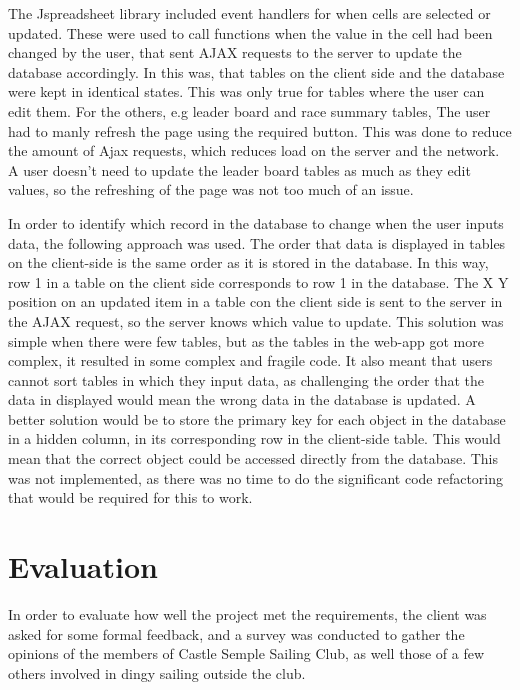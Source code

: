 \documentclass{l4proj}
\begin{document}
The Jspreadsheet library included event handlers for when cells are selected or updated. These were used to call functions when the value in the cell had been changed by the user, that sent AJAX requests to the server to update the database accordingly. In this was, that tables on the client side and the database were kept in identical states. This was only true for tables where the user can edit them. For the others, e.g leader board and race summary tables, The user had to manly refresh the page using the required button. This was done to reduce the amount of Ajax requests, which reduces load on the server and the network. A user doesn't need to update the leader board tables as much as they edit values, so the refreshing of the page was not too much of an issue.

In order to identify which record in the database to change when the user inputs data, the following approach was used. The order that data is displayed in tables on the client-side is the same order as it is stored in the database. In this way, row 1 in a table on the client side corresponds to row 1 in the database. The X Y position on an updated item in a table con the client side is sent to the server in the AJAX request, so the server knows which value to update. This solution was simple when there were few tables, but as the tables in the web-app got more complex, it resulted in some complex and fragile code. It also meant that users cannot sort tables in which they input data, as challenging the order that the data in displayed would mean the wrong data in the database is updated. A better solution would be to store the primary key for each object in the database in a hidden column, in its corresponding row in the client-side table. This would mean that the correct object could be accessed directly from the database. This was not implemented, as there was no time to do the significant code refactoring that would be required for this to work.


\chapter{Evaluation}\label{chap:eval}
In order to evaluate how well the project met the requirements, the client was asked for some formal feedback, and a survey was conducted to gather the opinions of the members of Castle Semple Sailing Club, as well those of a few others involved in dingy sailing outside the club.
\end{document}
